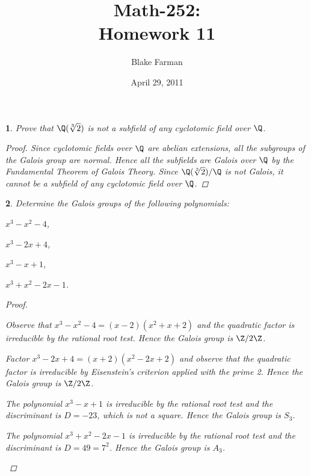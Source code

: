 \documentclass[10pt]{amsart}
\author{Blake Farman}
\title{Math-252:\\Homework 11}
\date{April 29, 2011}
\begin{document}
\maketitle

\newtheorem{thm}{}

\begin{thm}
  \label{Ex1}
  Prove that $\Q(\sqrt[3]{2})$ is not a subfield of any cyclotomic field over $\Q$.
  
  \begin{proof}
    Since cyclotomic fields over $\Q$ are abelian extensions, all the subgroups of the Galois group are normal.
    Hence all the subfields are Galois over $\Q$ by the Fundamental Theorem of Galois Theory.
    Since $\Q(\sqrt[3]{2})/\Q$ is not Galois, it cannot be a subfield of any cyclotomic field over $\Q$.
  \end{proof}
\end{thm}

\begin{thm}
  \label{Ex2}
  Determine the Galois groups of the following polynomials:
  \begin{alphaenum}
  \item
    $x^3 - x^2 - 4$,
  \item
    $x^3 - 2x + 4$,
  \item
    $x^3 - x + 1$,
  \item
    $x^3 + x^2 - 2x - 1$.
  \end{alphaenum}
  \begin{proof}
    \begin{alphaenum}
    \item
      Observe that $x^3 - x^2 - 4 = (x-2)(x^2+x+2)$ and the quadratic factor is irreducible by the rational root test.
      Hence the Galois group is $\Z/2\Z$.
    \item
      Factor $x^3 - 2x + 4 = (x+2)(x^2-2x+2)$ and observe that the quadratic factor is irreducible by Eisenstein's criterion applied with the prime 2.
      Hence the Galois group is $\Z/2\Z$.
    \item
      The polynomial $x^3 - x + 1$ is irreducible by the rational root test and the discriminant is $D = -23$, which is not a square.
      Hence the Galois group is $S_3$.
    \item
      The polynomial $x^3 + x^2 - 2x - 1$ is irreducible by the rational root test and the discriminant is $D = 49 = 7^2$.
      Hence the Galois group is $A_3$.
    \end{alphaenum}
  \end{proof}
\end{thm}
\end{document}

